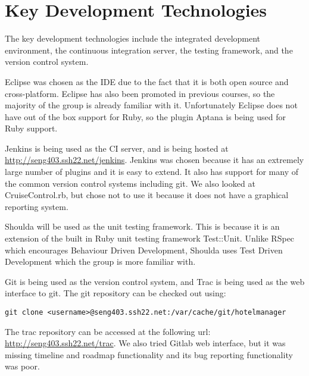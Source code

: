\section{Key Development Technologies}

The key development technologies include the integrated development environment, the continuous integration server, the testing framework, and the version control system.

Eclipse was chosen as the IDE due to the fact that it is both open source and cross-platform. Eclipse has also been promoted in previous courses, so the majority of the group is already familiar with it. Unfortunately Eclipse does not have out of the box support for Ruby, so the plugin Aptana is being used for Ruby support.

Jenkins is being used as the CI server, and is being hosted at \href{http://seng403.ssh22.net/jenkins}{http://seng403.ssh22.net/jenkins}. Jenkins was chosen because it has an extremely large number of plugins and it is easy to extend. It also has support for many of the common version control systems including git. We also looked at CruiseControl.rb, but chose not to use it because it does not have a graphical reporting system.

Shoulda will be used as the unit testing framework. This is because it is an extension of the built in Ruby unit testing framework Test::Unit. Unlike RSpec which encourages Behaviour Driven Development, Shoulda uses Test Driven Development which the group is more familiar with.

Git is being used as the version control system, and Trac is being used as the web interface to git. The git repository can be checked out using:
\lstset{language=bash}
\begin{lstlisting}
git clone <username>@seng403.ssh22.net:/var/cache/git/hotelmanager
\end{lstlisting}
The trac repository can be accessed at the following url: \href{http://seng403.ssh22.net/trac}{http://seng403.ssh22.net/trac}. We also tried Gitlab web interface, but it was missing timeline and roadmap functionality and its bug reporting functionality was poor.
